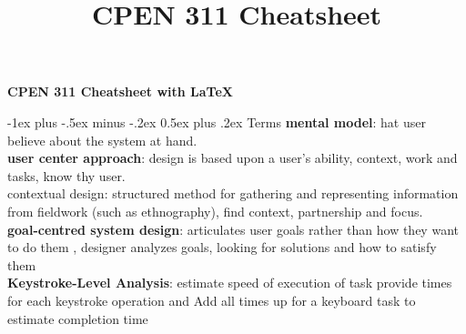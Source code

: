 \documentclass[10pt,landscape]{article}
\title{CPEN 311 Cheatsheet}
\makeatletter
\renewcommand{\section}{\@startsection{section}{1}{0mm}%
                                {-1ex plus -.5ex minus -.2ex}%
                                {0.5ex plus .2ex}%
                                {\normalfont\large\bfseries}}
\theoremstyle{definition}
\makeatother
\begin{document}
\raggedright
\footnotesize

\begin{center}
     \Large{\textbf{CPEN 311 Cheatsheet with \LaTeX}} \\
\end{center}
\begin{multicols}{3}
\setlength{\premulticols}{1pt}
\setlength{\postmulticols}{1pt}
\setlength{\multicolsep}{1pt}
\setlength{\columnsep}{2pt}

\section{Terms}
\textbf{mental model}: hat user believe about the system at hand.  \\
\textbf{user center approach}: design is based upon a user’s ability, context, work and tasks, know thy user. \\
contextual design: structured method for gathering and representing information from fieldwork (such as ethnography), find context, partnership and focus. \\
\textbf{goal-centred system design}: articulates user goals rather than how they want to do them , designer analyzes goals, looking for solutions and how to satisfy them \\
\textbf{Keystroke-Level Analysis}: estimate speed of execution of task  provide times for each keystroke operation and Add all times up for a keyboard task to estimate completion
time \\


\end{multicols}
\end{document}
